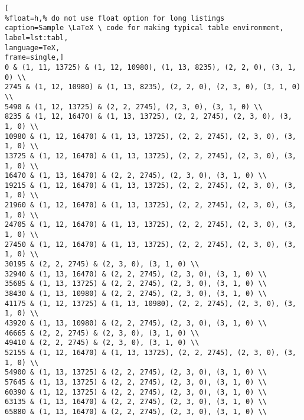 \begin{lstlisting}[
%float=h,% do not use float option for long listings
caption=Sample \LaTeX \ code for making typical table environment, 
label=lst:tabl,
language=TeX,
frame=single,]
0 & (1, 11, 13725) & (1, 12, 10980), (1, 13, 8235), (2, 2, 0), (3, 1, 0) \\
2745 & (1, 12, 10980) & (1, 13, 8235), (2, 2, 0), (2, 3, 0), (3, 1, 0) \\
5490 & (1, 12, 13725) & (2, 2, 2745), (2, 3, 0), (3, 1, 0) \\
8235 & (1, 12, 16470) & (1, 13, 13725), (2, 2, 2745), (2, 3, 0), (3, 1, 0) \\
10980 & (1, 12, 16470) & (1, 13, 13725), (2, 2, 2745), (2, 3, 0), (3, 1, 0) \\
13725 & (1, 12, 16470) & (1, 13, 13725), (2, 2, 2745), (2, 3, 0), (3, 1, 0) \\
16470 & (1, 13, 16470) & (2, 2, 2745), (2, 3, 0), (3, 1, 0) \\
19215 & (1, 12, 16470) & (1, 13, 13725), (2, 2, 2745), (2, 3, 0), (3, 1, 0) \\
21960 & (1, 12, 16470) & (1, 13, 13725), (2, 2, 2745), (2, 3, 0), (3, 1, 0) \\
24705 & (1, 12, 16470) & (1, 13, 13725), (2, 2, 2745), (2, 3, 0), (3, 1, 0) \\
27450 & (1, 12, 16470) & (1, 13, 13725), (2, 2, 2745), (2, 3, 0), (3, 1, 0) \\
30195 & (2, 2, 2745) & (2, 3, 0), (3, 1, 0) \\
32940 & (1, 13, 16470) & (2, 2, 2745), (2, 3, 0), (3, 1, 0) \\
35685 & (1, 13, 13725) & (2, 2, 2745), (2, 3, 0), (3, 1, 0) \\
38430 & (1, 13, 10980) & (2, 2, 2745), (2, 3, 0), (3, 1, 0) \\
41175 & (1, 12, 13725) & (1, 13, 10980), (2, 2, 2745), (2, 3, 0), (3, 1, 0) \\
43920 & (1, 13, 10980) & (2, 2, 2745), (2, 3, 0), (3, 1, 0) \\
46665 & (2, 2, 2745) & (2, 3, 0), (3, 1, 0) \\
49410 & (2, 2, 2745) & (2, 3, 0), (3, 1, 0) \\
52155 & (1, 12, 16470) & (1, 13, 13725), (2, 2, 2745), (2, 3, 0), (3, 1, 0) \\
54900 & (1, 13, 13725) & (2, 2, 2745), (2, 3, 0), (3, 1, 0) \\
57645 & (1, 13, 13725) & (2, 2, 2745), (2, 3, 0), (3, 1, 0) \\
60390 & (1, 12, 13725) & (2, 2, 2745), (2, 3, 0), (3, 1, 0) \\
63135 & (1, 13, 16470) & (2, 2, 2745), (2, 3, 0), (3, 1, 0) \\
65880 & (1, 13, 16470) & (2, 2, 2745), (2, 3, 0), (3, 1, 0) \\

\end{lstlisting}
